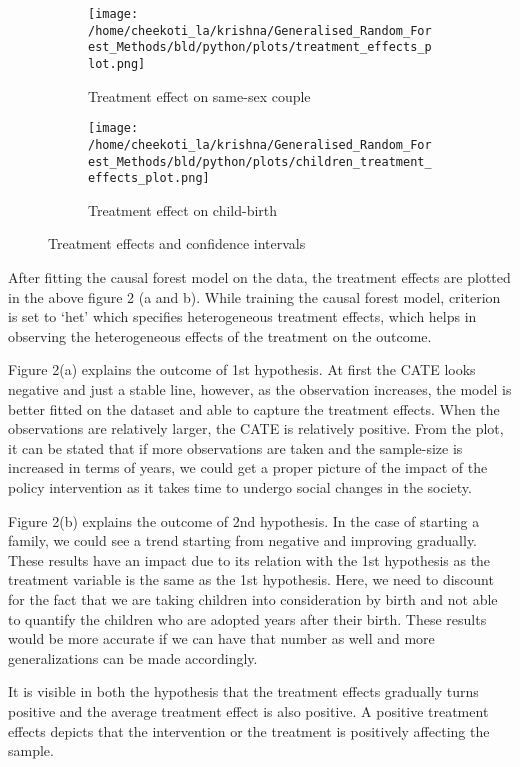 \documentclass[11pt, a4paper, leqno]{article}
\begin{document}
\begin{figure}[!tbp]
  \begin{subfigure}[c]{0.5\textwidth}
    \texttt{[image: /home/cheekoti\_la/krishna/Generalised\_Random\_Forest\_Methods/bld/python/plots/treatment\_effects\_plot.png]}
    \caption{Treatment effect on same-sex couple}
    \label{fig:f3}
  \end{subfigure}
  \hfill
  \begin{subfigure}[c]{0.5\textwidth}
    \texttt{[image: /home/cheekoti\_la/krishna/Generalised\_Random\_Forest\_Methods/bld/python/plots/children\_treatment\_effects\_plot.png]}
    \caption{Treatment effect on child-birth}
    \label{fig:f4}
  \end{subfigure}
  \caption{Treatment effects and confidence intervals}
\end{figure}

After fitting the causal forest model on the data, the treatment effects are plotted in the above figure 2 (a and b).
While training the causal forest model, criterion is set to `het' which specifies heterogeneous treatment effects, which helps in observing the heterogeneous effects of the
treatment on the outcome.

Figure 2(a) explains the outcome of 1st hypothesis. At first the CATE looks negative and just a stable line, however, as the observation increases,
 the model is better fitted on the dataset and able to capture the treatment effects. When the observations are relatively larger, the CATE is
 relatively positive. From the plot, it can be stated that if more observations are taken and the sample-size is increased in terms of years, we could
 get a proper picture of the impact of the policy intervention as it takes time to undergo social changes in the society.

Figure 2(b) explains the outcome of 2nd hypothesis. In the case of starting a family, we could see a trend starting from negative and improving
gradually. These results have an impact due to its relation with the 1st hypothesis as the treatment variable is the same as the 1st hypothesis.
Here, we need to discount for the fact that we are taking children into consideration by birth and not able to quantify the children who are adopted
years after their birth. These results would be more accurate if we can have that number as well and more generalizations can be made accordingly.

It is visible in both the hypothesis that the treatment effects gradually turns positive and the average treatment effect is also positive. A
positive treatment effects depicts that the intervention or the treatment is positively affecting the sample.
\end{document}
